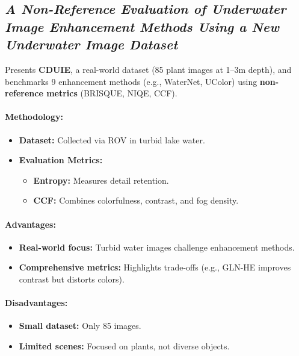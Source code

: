 \subsection{\textit{A Non-Reference Evaluation of Underwater Image Enhancement Methods Using a New Underwater Image Dataset\cite{Saleem_2023}}}

Presents \textbf{CDUIE}, a real-world dataset (85 plant images at 1--3m depth), and benchmarks 9 enhancement methods (e.g., WaterNet, UColor) using \textbf{non-reference metrics} (BRISQUE, NIQE, CCF).

\paragraph{Methodology:}
\begin{itemize}
    \item \textbf{Dataset:} Collected via ROV in turbid lake water.
    \item \textbf{Evaluation Metrics:}
          \begin{itemize}
              \item \textbf{Entropy:} Measures detail retention.
              \item \textbf{CCF:} Combines colorfulness, contrast, and fog density.
          \end{itemize}
\end{itemize}

\paragraph{Advantages:}
\begin{itemize}
    \item \textbf{Real-world focus:} Turbid water images challenge enhancement methods.
    \item \textbf{Comprehensive metrics:} Highlights trade-offs (e.g., GLN-HE improves contrast but distorts colors).
\end{itemize}

\paragraph{Disadvantages:}
\begin{itemize}
    \item \textbf{Small dataset:} Only 85 images.
    \item \textbf{Limited scenes:} Focused on plants, not diverse objects.
\end{itemize}